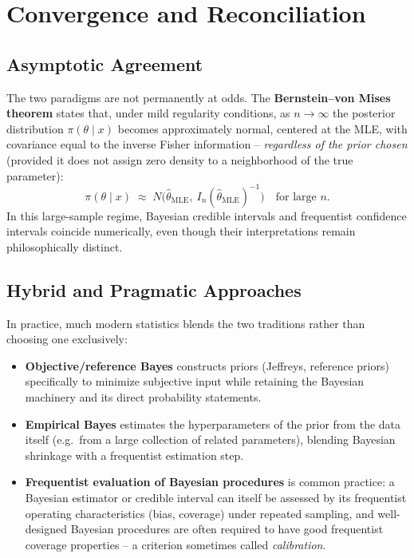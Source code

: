 \documentclass[11pt,a4paper]{article}
\begin{document}
\section{Convergence and Reconciliation}

\subsection{Asymptotic Agreement}
The two paradigms are not permanently at odds. The \textbf{Bernstein--von Mises theorem} states that, under mild regularity conditions, as $n \to \infty$ the posterior distribution $\pi(\theta \mid x)$ becomes approximately normal, centered at the MLE, with covariance equal to the inverse Fisher information -- \emph{regardless of the prior chosen} (provided it does not assign zero density to a neighborhood of the true parameter):
\begin{equation}
\pi(\theta \mid x) \;\approx\; N\!\Big(\hat\theta_{\text{MLE}},\ I_n(\hat\theta_{\text{MLE}})^{-1}\Big) \quad \text{for large } n.
\end{equation}
In this large-sample regime, Bayesian credible intervals and frequentist confidence intervals coincide numerically, even though their interpretations remain philosophically distinct.

\subsection{Hybrid and Pragmatic Approaches}
In practice, much modern statistics blends the two traditions rather than choosing one exclusively:
\begin{itemize}[leftmargin=2em]
  \item \textbf{Objective/reference Bayes} constructs priors (Jeffreys, reference priors) specifically to minimize subjective input while retaining the Bayesian machinery and its direct probability statements.
  \item \textbf{Empirical Bayes} estimates the hyperparameters of the prior from the data itself (e.g.\ from a large collection of related parameters), blending Bayesian shrinkage with a frequentist estimation step.
  \item \textbf{Frequentist evaluation of Bayesian procedures} is common practice: a Bayesian estimator or credible interval can itself be assessed by its frequentist operating characteristics (bias, coverage) under repeated sampling, and well-designed Bayesian procedures are often required to have good frequentist coverage properties -- a criterion sometimes called \emph{calibration}.
\end{itemize}
\end{document}
